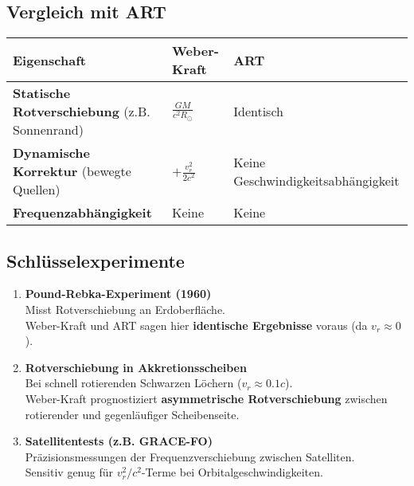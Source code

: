 \documentclass{article}
\begin{document}
\begin{center}
\end{center}

\subsection*{Vergleich mit ART}
\begin{table}[H]
    \centering
    \begin{tabular}{lp{4cm}p{4cm}}
        \toprule
        Eigenschaft & Weber-Kraft & ART \\
        \midrule
        \textbf{Statische Rotverschiebung} (z.B. Sonnenrand) & $\frac{GM}{c^2 R_\odot}$ & Identisch \\
        \textbf{Dynamische Korrektur} (bewegte Quellen) & $+ \frac{v_r^2}{2c^2}$ & Keine Geschwindigkeitsabhängigkeit \\
        \textbf{Frequenzabhängigkeit} & Keine & Keine \\
        \bottomrule
    \end{tabular}
\end{table}

\subsection*{Schlüsselexperimente}
\begin{enumerate}
    \item \textbf{Pound-Rebka-Experiment (1960)} \\
    Misst Rotverschiebung an Erdoberfläche. \\
    Weber-Kraft und ART sagen hier \textbf{identische Ergebnisse} voraus (da $v_r \approx 0$).
    
    \item \textbf{Rotverschiebung in Akkretionsscheiben} \\
    Bei schnell rotierenden Schwarzen Löchern ($v_r \approx 0.1c$). \\
    Weber-Kraft prognostiziert \textbf{asymmetrische Rotverschiebung} zwischen rotierender und gegenläufiger Scheibenseite.
    
    \item \textbf{Satellitentests (z.B. GRACE-FO)} \\
    Präzisionsmessungen der Frequenzverschiebung zwischen Satelliten. \\
    Sensitiv genug für $v_r^2/c^2$-Terme bei Orbitalgeschwindigkeiten.
\end{enumerate}
\end{document}

